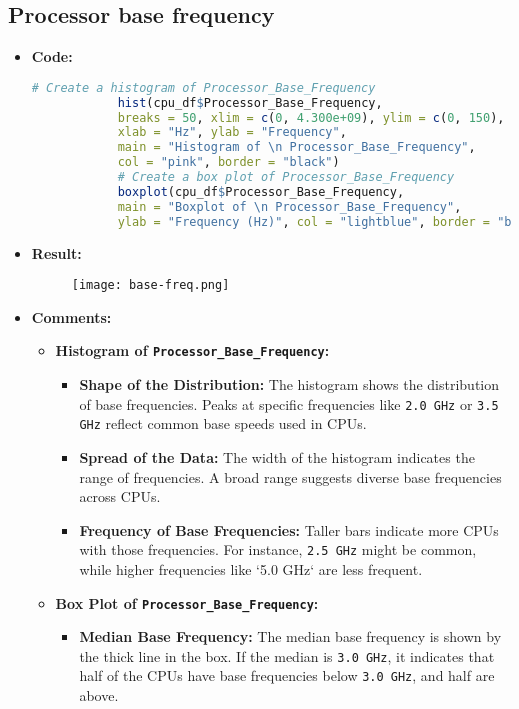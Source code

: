 \documentclass{article}
\begin{document}
	\subsection{Processor base frequency}
	\begin{itemize}
		\item \textbf{Code:}
		\begin{lstlisting}[basicstyle=\ttfamily, frame=single,language=R]
			# Create a histogram of Processor_Base_Frequency
			hist(cpu_df$Processor_Base_Frequency, 
			breaks = 50, xlim = c(0, 4.300e+09), ylim = c(0, 150),
			xlab = "Hz", ylab = "Frequency", 
			main = "Histogram of \n Processor_Base_Frequency", 
			col = "pink", border = "black")
			# Create a box plot of Processor_Base_Frequency
			boxplot(cpu_df$Processor_Base_Frequency, 
			main = "Boxplot of \n Processor_Base_Frequency", 
			ylab = "Frequency (Hz)", col = "lightblue", border = "black")
		\end{lstlisting}
		\item \textbf{Result:}
		\begin{figure}[h]
			\centering
			\texttt{[image: base-freq.png]} %
			\label{fig:enter-label}
		\end{figure}
		\item \textbf{Comments:}
		\begin{itemize}
			\item \textbf{Histogram of \texttt{Processor\_Base\_Frequency}:}
			\begin{itemize}
				\item \textbf{Shape of the Distribution:} The histogram shows the distribution of base frequencies. Peaks at specific frequencies like \texttt{2.0 GHz} or \texttt{3.5 GHz} reflect common base speeds used in CPUs.
				\item \textbf{Spread of the Data:} The width of the histogram indicates the range of frequencies. A broad range suggests diverse base frequencies across CPUs.
				\item \textbf{Frequency of Base Frequencies:} Taller bars indicate more CPUs with those frequencies. For instance, \texttt{2.5 GHz} might be common, while higher frequencies like `5.0 GHz` are less frequent.
			\end{itemize}
			\item \textbf{Box Plot of \texttt{Processor\_Base\_Frequency}:}
			\begin{itemize}
				\item \textbf{Median Base Frequency:} The median base frequency is shown by the thick line in the box. If the median is \texttt{3.0 GHz}, it indicates that half of the CPUs have base frequencies below \texttt{3.0 GHz}, and half are above.

\end{itemize}
\end{itemize}
\end{itemize}
\end{document}
